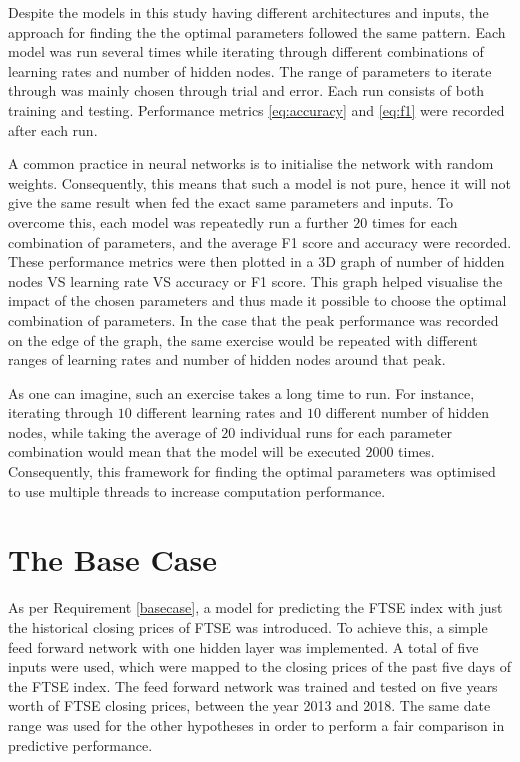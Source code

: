 \documentclass{UoYCSproject}
\begin{document}
Despite the models in this study having different architectures and inputs, the approach for finding the the optimal parameters followed the same pattern. Each model was run several times while iterating through different combinations of learning rates and number of hidden nodes. The range of parameters to iterate through was mainly chosen through trial and error. Each run consists of both training and testing. Performance metrics \ref{eq:accuracy} and \ref{eq:f1} were recorded after each run.

A common practice in neural networks is to initialise the network with random weights. Consequently, this means that such a model is not pure, hence it will not give the same result when fed the exact same parameters and inputs. To overcome this, each model was repeatedly run a further $20$ times for each combination of parameters, and the average F1 score and accuracy were recorded. These performance metrics were then plotted in a 3D graph of number of hidden nodes VS learning rate VS accuracy or F1 score. This graph helped visualise the impact of the chosen parameters and thus made it possible to choose the optimal combination of parameters. In the case that the peak performance was recorded on the edge of the graph, the same exercise would be repeated with different ranges of learning rates and number of hidden nodes around that peak.

As one can imagine, such an exercise takes a long time to run. For instance, iterating through $10$ different learning rates and $10$ different number of hidden nodes, while taking the average of $20$ individual runs for each parameter combination would mean that the model will be executed $2000$ times. Consequently, this framework for finding the optimal parameters was optimised to use multiple threads to increase computation performance.   

\section{The Base Case}
\label{sec:thebasecase}
As per Requirement \ref{basecase}, a model for predicting the FTSE index with just the historical closing prices of FTSE was introduced.  To achieve this, a simple feed forward network with one hidden layer was implemented. A total of five inputs were used, which were mapped to the closing prices of the past five days of the FTSE index. The feed forward network was trained and tested on five years worth of FTSE closing prices, between the year 2013 and 2018. The same date range was used for the other hypotheses in order to perform a fair comparison in predictive performance.
\end{document}
